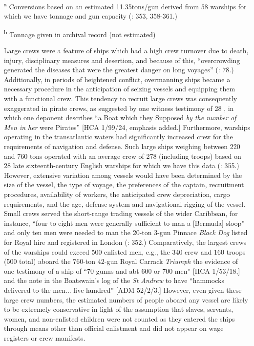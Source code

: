 \textsuperscript{a}\textbf{\textsuperscript{} }Conversions based on an estimated 11.35tons/gun derived from 58 warships for which we have tonnage and gun capacity (\citealt{Bicheno2012}: 353, 358-361.) 

\textsuperscript{b} Tonnage given in archival record (not estimated)

Large crews were a feature of ships which had a high crew turnover due to death, injury, disciplinary measures and desertion, and because of this, “overcrowding generated the diseases that were the greatest danger on long voyages” (\citealt{Bicheno2012}: 78.) Additionally, in periods of heightened conflict, overmanning ships became a necessary procedure in the anticipation of seizing vessels and equipping them with a functional crew. This tendency to recruit large crews was consequently exaggerated in pirate crews, as suggested by one witness testimony of 28 \citealt{March1722}, in which one deponent describes “a Boat which they Supposed \textit{by the number of Men in her} were Pirates” [HCA 1/99/24, emphasis added.] Furthermore, warships operating in the transatlantic waters had significantly increased crew for the requirements of navigation and defense. Such large ships weighing between 220 and 760 tons operated with an average crew of 278 (including troops) based on 28 late sixteenth-century English warships for which we have this data (\citealt{Bicheno2012}: 355.) However, extensive variation among vessels would have been determined by the size of the vessel, the type of voyage, the preferences of the captain, recruitment procedures, availability of workers, the anticipated crew depreciation, cargo requirements, and the age, defense system and navigational rigging of the vessel. Small crews served the short-range trading vessels of the wider Caribbean, for instance, “four to eight men were generally sufficient to man a [Bermuda] sloop” \citep[123]{Jarvis2010} and only ten men were needed to man the 20-ton 3-gun Pinnace \textit{Black Dog} listed for Royal hire and registered in London (\citealt{Bicheno2012}: 352.) Comparatively, the largest crews of the warships could exceed 500 enlisted men, e.g., the 340 crew and 160 troops (500 total) aboard the 760-ton 42-gun Royal Carrack \textit{Triumph} \citep[355,]{Bicheno2012} the evidence of one testimony of a ship of “70 gunns and abt 600 or 700 men” [HCA 1/53/18,] and the note in the Boatswain’s log of the \textit{St Andrew} to have “hammocks delivered to the men... five hundred” [ADM 52/2/3.] However, even given these large crew numbers, the estimated numbers of people aboard any vessel are likely to be extremely conservative in light of the assumption that slaves, servants, women, and non-enlisted children were not counted as they entered the ships through means other than official enlistment and did not appear on wage registers or crew manifests. 

